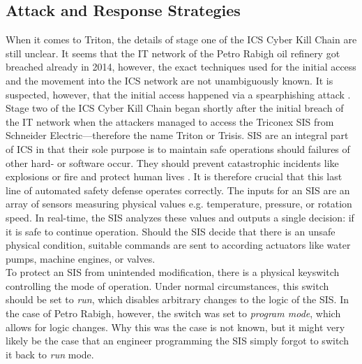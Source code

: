 \documentclass[runningheads]{llncs}
\begin{document}
\subsection{Attack and Response Strategies}
\label{subsection:triton-attack-response}
When it comes to Triton, the details of stage one of the ICS Cyber Kill Chain are still unclear.
It seems that the IT network of the Petro Rabigh oil refinery got breached already in 2014, however, the exact techniques used for the initial access and the movement into the ICS network are not unambiguously known.
It is suspected, however, that the initial access happened via a spearphishing attack \cite{nohe.19}.
\\
Stage two of the ICS Cyber Kill Chain began shortly after the initial breach of the IT network when the attackers managed to access the Triconex SIS from Schneider Electric---therefore the name Triton or Trisis.
SIS are an integral part of ICS in that their sole purpose is to maintain safe operations should failures of other hard- or software occur.
They should prevent catastrophic incidents like explosions or fire and protect human lives \cite{pinto.18}.
It is therefore crucial that this last line of automated safety defense operates correctly.
The inputs for an SIS are an array of sensors measuring physical values e.g. temperature, pressure, or rotation speed.
In real-time, the SIS analyzes these values and outputs a single decision: if it is safe to continue operation.
Should the SIS decide that there is an unsafe physical condition, suitable commands are sent to according actuators like water pumps, machine engines, or valves. \cite{dragos.17}\\
To protect an SIS from unintended modification, there is a physical keyswitch controlling the mode of operation.
Under normal circumstances, this switch should be set to \textit{run}, which disables arbitrary changes to the logic of the SIS.
In the case of Petro Rabigh, however, the switch was set to \textit{program mode}, which allows for logic changes.
Why this was the case is not known, but it might very likely be the case that an engineer programming the SIS simply forgot to switch it back to \textit{run} mode.
\end{document}
